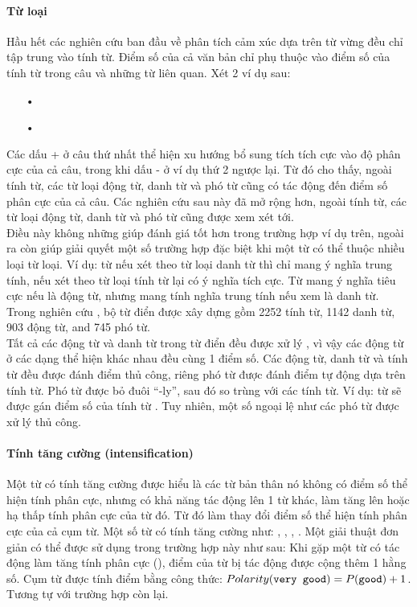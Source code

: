 \paragraph*{Từ loại}
Hầu hết các nghiên cứu ban đầu về phân tích cảm xúc dựa trên từ vừng đều chỉ tập trung vào tính từ. Điểm số của cả văn bản chỉ phụ thuộc vào điểm số của tính từ trong câu và những từ liên quan. 
Xét 2 ví dụ sau: 
\begin{itemize}
\item[•] 
\item[•] 
\end{itemize}
Các dấu + ở câu thứ nhất thể hiện xu hướng bổ sung tích tích cực vào độ phân cực của cả câu, trong khi dấu - ở ví dụ thứ 2 ngược lại. Từ đó cho thấy, ngoài tính từ, các từ loại động từ, danh từ và phó từ cũng có tác động đến điểm số phân cực của cả câu. Các nghiên cứu sau này đã mở rộng hơn, ngoài tính từ, các từ loại động từ, danh từ và phó từ cũng được xem xét tới. \\

Điều này không những giúp đánh giá tốt hơn trong trường hợp ví dụ trên, ngoài ra còn giúp giải quyết một số trường hợp đặc biệt khi một từ có thể thuộc nhiều loại từ loại. Ví dụ: từ  nếu xét theo từ loại danh từ thì chỉ mang ý nghĩa trung tính, nếu xét theo từ loại tính từ lại có ý nghĩa tích cực. Từ  mang ý nghĩa tiêu cực nếu là động từ, nhưng mang tính nghĩa trung tính nếu xem là danh từ. Trong nghiên cứu \cite{taboada2011lexicon}, bộ từ điển được xây dựng gồm 2252 tính từ, 1142 danh từ, 903 động từ, and 745 phó từ. \\

Tất cả các động từ và danh từ trong từ điển đều được xử lý , vì vậy các động từ ở các dạng thể hiện khác nhau đều cùng 1 điểm số. Các động từ, danh từ và tính từ đều được đánh điểm thủ công, riêng phó từ được đánh điểm tự động dựa trên tính từ. Phó từ được bỏ đuôi ``-ly'', sau đó so trùng với các tính từ. Ví dụ: từ  sẽ được gán điểm số của tính từ . Tuy nhiên, một số ngoại lệ như các phó từ  được xử lý thủ công. 
\paragraph*{Tính tăng cường (intensification)}
Một từ có tính tăng cường được hiểu là các từ bản thân nó không có điểm số thể hiện tính phân cực, nhưng có khả năng tác động lên 1 từ khác, làm tăng lên hoặc hạ thấp tính phân cực của từ đó. Từ đó làm thay đổi điểm số thể hiện tính phân cực của cả cụm từ. Một số từ có tính tăng cường như: , , , . Một giải thuật đơn giản có thể được sử dụng trong trường hợp này như sau:
Khi gặp một từ có tác động làm tăng tính phân cực (), điểm của từ bị tác động được cộng thêm 1 hằng số. 
Cụm từ  được tính điểm bằng công thức: $Polarity(\text{{\ttfamily very good}}) = P(\text{{\ttfamily good}}) + 1$.
Tương tự với trường hợp còn lại. \\

